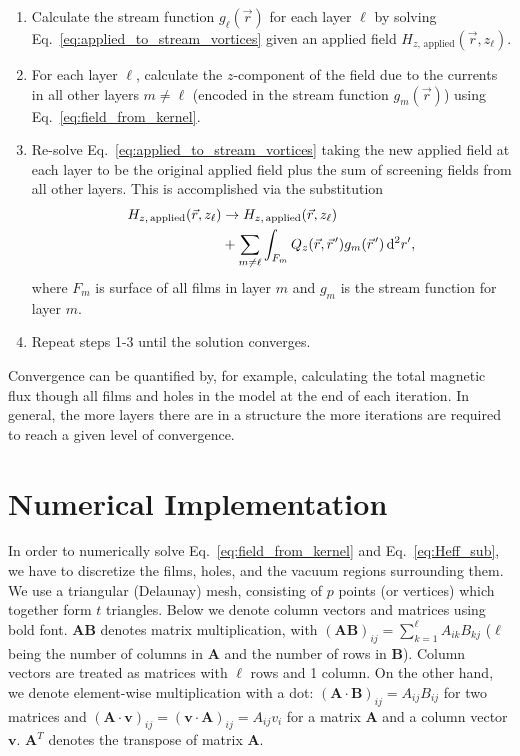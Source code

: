 \documentclass[final,3p,times,twocolumn]{elsarticle}
\newcommand{\pvec}[1]{\vec{#1}\mkern2mu\vphantom{#1}}
\begin{document}
\begin{enumerate}
    \item{
        Calculate the stream function $g_\ell(\vec{r})$ for each layer $\ell$ by solving Eq.~\ref{eq:applied_to_stream_vortices} given an applied field $H_{z,\,\mathrm{applied}}(\vec{r}, z_\ell)$.
    }
    \item{
        For each layer $\ell$, calculate the $z$-component of the field due to the currents in all other layers $m\neq\ell$ (encoded in the stream function $g_m(\vec{r})$)
        using Eq.~\ref{eq:field_from_kernel}.
    }
    \item{
        Re-solve Eq.~\ref{eq:applied_to_stream_vortices} taking the new applied field at each layer to be the original applied field plus the sum of screening fields from all other layers. This is accomplished via the substitution
        \begin{align}
        \begin{split}
            H_{z,\,\mathrm{applied}}(\vec{r}, z_\ell)
            &\to H_{z,\,\mathrm{applied}}(\vec{r}, z_\ell)\\
            &+ \sum_{m\neq\ell}
            \int_{F_m} Q_z(\vec{r},\pvec{r}')g_m(\pvec{r}')\,\mathrm{d}^2r',
            \label{eq:iterative}
        \end{split}
        \end{align}
        where $F_m$ is surface of all films in layer $m$ and $g_m$ is the stream function for layer $m$.
    }
    \item{
        Repeat steps 1-3 until the solution converges.
    }
\end{enumerate}

Convergence can be quantified by, for example, calculating the total magnetic flux though all films and holes in the model at the end of each iteration. In general, the more layers there are in a structure the more iterations are  required to reach a given level of convergence.

\section{Numerical Implementation}
\label{section:implementation}

In order to numerically solve Eq.~\ref{eq:field_from_kernel} and Eq.~\ref{eq:Heff_sub}, we have to discretize the films, holes, and the vacuum regions surrounding them. We use a triangular
(Delaunay) mesh, consisting of $p$ points (or vertices)
which together form $t$ triangles. Below we denote column vectors and matrices using bold font. $\mathbf{A}\mathbf{B}$
denotes matrix multiplication, with $(\mathbf{A}\mathbf{B})_{ij}=\sum_{k=1}^\ell A_{ik}B_{kj}$
($\ell$ being the number of columns in $\mathbf{A}$ and the number of rows in $\mathbf{B}$). Column vectors are treated as matrices with $\ell$ rows and 1 column. On the other hand, we denote element-wise multiplication with a dot: $(\mathbf{A}\cdot\mathbf{B})_{ij}=A_{ij}B_{ij}$ for two matrices
and $(\mathbf{A}\cdot\mathbf{v})_{ij}=(\mathbf{v}\cdot\mathbf{A})_{ij}=A_{ij}v_{i}$ for a matrix $\mathbf{A}$ and a column vector $\mathbf{v}$. $\mathbf{A}^T$ denotes the transpose of matrix $\mathbf{A}$.
\end{document}
